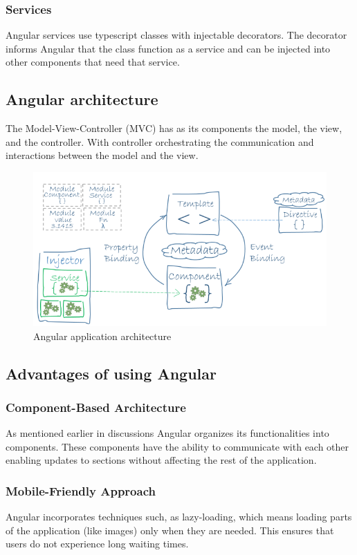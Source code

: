 \subsubsection{Services} Angular services use typescript classes with injectable decorators. The decorator informs Angular that the class function as a service
and can be injected into other components that need that service.\cite{angular-services}
\subsection{Angular architecture} 
The Model-View-Controller (MVC) has as its components the model, the view, and the controller. With controller orchestrating the communication and
interactions between the model and the view.

\begin{figure}[ht]
    \centering
    \includegraphics[width=0.85\linewidth]{images/angular-arch.png}
    \caption{Angular application architecture}
    \label{fig:angular-arch}
\end{figure}

\subsection{Advantages of using Angular}
\subsubsection{Component-Based Architecture}
As mentioned earlier in discussions Angular organizes its functionalities into components. These components have the ability to communicate with each other enabling updates to sections without affecting the rest of the application.

\subsubsection{Mobile-Friendly Approach}
Angular incorporates techniques such, as lazy-loading, which means loading parts of the application (like images) only when they are needed. This ensures that users do not experience long waiting times.


